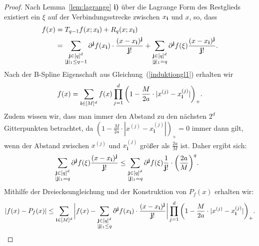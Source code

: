 \begin{proof}
Nach Lemma~\ref{lem:lagrange} \textbf{i)} über die Lagrange Form des Restglieds existiert ein $\xi$ auf der Verbindungsstrecke zwischen $x_{\mathbf{i}}$ und $x$, so, dass 
\begin{equation}
\label{eq:lagrange}
\begin{split}
f(x) & = T_{q - 1}f(x; x_{\mathbf{i}}) + R_q(x; x_{\mathbf{i}})\\
& = \sum_{\substack{\mathbf{j} \in [q]^d \\ |\mathbf{j}|_1 \leq q - 1}}  \partial^{\mathbf{j}}f(x_{\mathbf{i}}) \cdot \frac{ (x - x_{\mathbf{i}})^{\mathbf{j}} }{\mathbf{j}!} + \sum_{\substack{ \mathbf{j} \in [q]^d \\|\mathbf{j}|_1 = q}} \partial^{\mathbf{j}}f(\xi) \frac{ (x - x_{\mathbf{i}})^{\mathbf{j}} }{\mathbf{j}!}.
\end{split}
\end{equation}
Nach der B-Spline Eigenschaft aus Gleichung~(\ref{induktiongl1}) erhalten wir 
$$f(x) = \sum_{\mathbf{i} \in [M]^d} f(x) \prod_{j = 1}^d \bigg(1 - \frac{M}{2a} \cdot |x^{(j)} - x_{\mathbf{i}}^{(j)}|\bigg)_+.$$ Zudem wissen wir, dass man immer den Abstand zu den nächsten $2^d$ Gitterpunkten betrachtet, da  $(1 - \frac{M}{2a} \cdot |x^{(j)} - x_{\mathbf{i}}^{(j)}|)_+ = 0$ immer dann gilt, wenn der Abstand zwischen $x^{(j)}$ und $x_{\mathbf{i}}^{(j)}$ größer als $\frac{2a}{M}$ ist. Daher ergibt sich:
\begin{equation}
\label{eq:absch}
\begin{split}
& \sum_{\substack{ \mathbf{j} \in [q]^d \\ |\mathbf{j}|_1 = q}} \partial^{\mathbf{j}}f(\xi) \frac{ (x - x_{\mathbf{i}})^{\mathbf{j}} }{\mathbf{j}!} \leq \sum_{\substack{ \mathbf{j} \in [q]^d \\ |\mathbf{j}|_1 = q}} \partial^{\mathbf{j}}f(\xi) \frac{1}{\mathbf{j}!} \cdot \bigg(\frac{2a}{M}\bigg)^q.
\end{split}
\end{equation} 
Mithilfe der Dreiecksungleichung und der Konstruktion von $P_f(x)$ erhalten wir:
\begin{equation}
\label{eq:drei}
\begin{split}
|f(x) - P_f(x)| \leq \sum_{\mathbf{i} \in [M]^d} \bigg|f(x) - \sum_{\substack{\mathbf{j} \in [q]^d \\|\mathbf{j}|_1 \leq q}} \partial^{\mathbf{j}}f(x_{\mathbf{i}}) \cdot \frac{(x - x_{\mathbf{i}})^{\mathbf{j}}}{\mathbf{j}!}\bigg| \prod_{j = 1}^d \bigg(1 - \frac{M}{2a} \cdot |x^{(j)} - x_{\mathbf{i}}^{(j)}|\bigg)_+.
\end{split}
\end{equation}

\end{proof}
